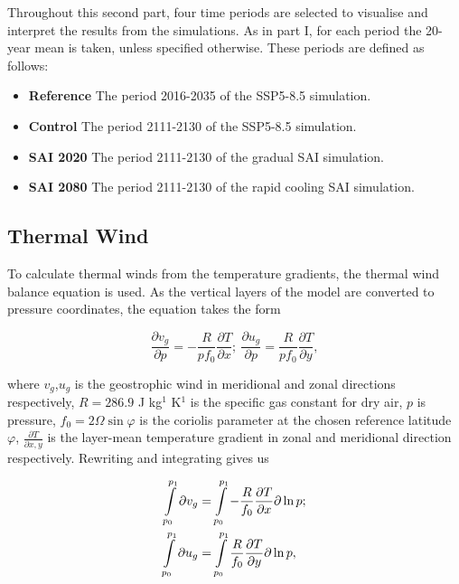 Throughout this second part, four time periods are selected to visualise and interpret the results from the simulations. As in part I, for each period the 20-year mean is taken, unless specified otherwise. These periods are defined as follows:

\begin{itemize}
    \item \textbf{Reference} The period 2016-2035 of the SSP5-8.5 simulation.
    \item \textbf{Control} The period 2111-2130 of the SSP5-8.5 simulation.
    \item \textbf{SAI 2020} The period 2111-2130 of the gradual SAI simulation.
    \item \textbf{SAI 2080} The period 2111-2130 of the rapid cooling SAI simulation.
\end{itemize} %


\subsection{Thermal Wind}
To calculate thermal winds from the temperature gradients, the thermal wind balance equation is used. As the vertical layers of the model are converted to pressure coordinates, the equation takes the form 

\begin{equation}
    \frac{\partial v_g}{\partial p} = - \frac{R}{pf_0} \frac{\partial T}{\partial x};\ 
    \frac{\partial u_g}{\partial p} = \frac{R}{pf_0} \frac{\partial T}{\partial y},
\end{equation}

where $v_g$,$u_g$ is the geostrophic wind in meridional and zonal directions respectively, $R = 286.9$ J kg$^{1}$ K$^{1}$ is the specific gas constant for dry air, $p$ is pressure, $f_0 = 2\Omega \sin \varphi$ is the coriolis parameter at the chosen reference latitude $\varphi$, $\frac{\partial T}{\partial x,y}$ is the layer-mean temperature gradient in zonal and meridional direction respectively. Rewriting and integrating gives us

\begin{equation}
    \begin{split}
        \int\displaylimits_{p_0}^{p_1} \partial v_g &= \int\displaylimits_{p_0}^{p_1} - \frac{R}{f_0} \frac{\partial T}{\partial x} \partial \ln p; \\
        \int\displaylimits_{p_0}^{p_1} \partial u_g &= \int\displaylimits_{p_0}^{p_1} \frac{R}{f_0} \frac{\partial T}{\partial y} \partial \ln p,
    \end{split}
\end{equation}

